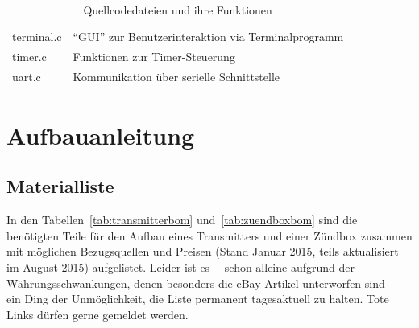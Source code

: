 \documentclass[pdftex, parskip, numbers=noenddot, toc=listof]{scrbook}
\begin{document}
\begin{table}[h]
\begin{tabular}{lp{125mm}}
			terminal.c                & \enquote{GUI} zur Benutzerinteraktion via Terminalprogramm                                                                 \\
			timer.c                   & Funktionen zur Timer-Steuerung                                                                                             \\
			uart.c                    & Kommunikation über serielle Schnittstelle                                                                                 \\ \hline
		\end{tabular}
		\caption{Quellcodedateien und ihre Funktionen}
		\label{tab:sourcefiles}
	\end{table}

	\part{Aufbauanleitung}

	\chapter{Materialliste}

	In den Tabellen~\ref{tab:transmitterbom} und~\ref{tab:zuendboxbom} sind die benötigten Teile für den Aufbau eines Transmitters und einer Zündbox zusammen mit möglichen Bezugsquellen und Preisen (Stand Januar 2015, teils aktualisiert im August 2015) aufgelistet. Leider ist es~-- schon alleine aufgrund der Währungsschwankungen, denen besonders die eBay-Artikel unterworfen sind~-- ein Ding der Unmöglichkeit, die Liste permanent tagesaktuell zu halten. Tote Links dürfen gerne gemeldet werden.
\end{document}
